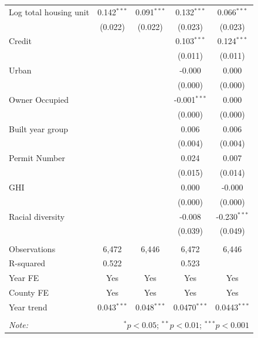 \documentclass[11pt,twoside,letterpaper]{article}
\begin{document}
\begin{table}[H]
{\begin{tabular}{@{\extracolsep{2pt}}lcccc}
Log total housing unit & 0.142$^{***}$ & 0.091$^{***}$ & 0.132$^{***}$ & 0.066$^{***}$ \\
& (0.022) & (0.022) & (0.023) & (0.023) \\
Credit &  &  & 0.103$^{***}$ & 0.124$^{***}$ \\
&  &  & (0.011) & (0.011) \\
Urban &  &  & -0.000 & 0.000 \\
&  &  & (0.000) & (0.000) \\
Owner Occupied &  &  & -0.001$^{***}$ & 0.000 \\
&  &  & (0.000) & (0.000) \\
Built year group &  &  & 0.006 & 0.006 \\
&  &  & (0.004) & (0.004) \\
Permit Number &  &  & 0.024 & 0.007 \\
&  &  & (0.015) & (0.014) \\
GHI &  &  & 0.000 & -0.000 \\
&  &  & (0.000) & (0.000) \\
Racial diversity &  &  & -0.008 & -0.230$^{***}$ \\
&  &  & (0.039) & (0.049) \\

\hline \\[-1.8ex]
Observations & 6,472 & 6,446 & 6,472 & 6,446 \\
R-squared & 0.522 &  & 0.523 &  \\
Year FE & Yes & Yes & Yes & Yes \\
County FE & Yes & Yes & Yes & Yes \\
Year trend & 0.043$^{***}$ & 0.048$^{***}$ & 0.0470$^{***}$ & 0.0443$^{***}$ \\
\hline
\hline \\[-1.8ex]
\textit{Note:} & \multicolumn{4}{r}{$^{*}p<0.05$; $^{**}p<0.01$; $^{***}p<0.001$} \\
\end{tabular}
}
\end{table}
\end{document}
